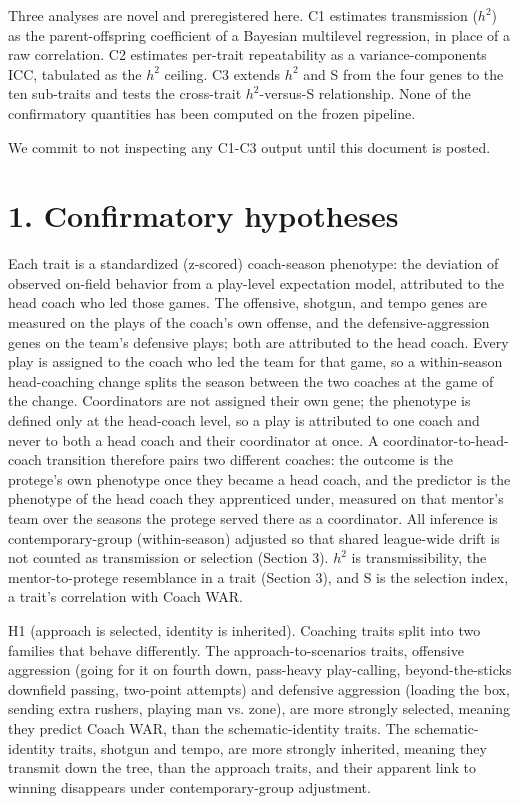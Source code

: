 \documentclass[11pt]{article}
\begin{document}
Three analyses are novel and preregistered here. C1 estimates transmission ($h^{2}$) as the parent-offspring coefficient of a Bayesian multilevel regression, in place of a raw correlation. C2 estimates per-trait repeatability as a variance-components ICC, tabulated as the $h^{2}$ ceiling. C3 extends $h^{2}$ and S from the four genes to the ten sub-traits and tests the cross-trait $h^{2}$-versus-S relationship. None of the confirmatory quantities has been computed on the frozen pipeline.

We commit to not inspecting any C1-C3 output until this document is posted.

\section*{1. Confirmatory hypotheses}

Each trait is a standardized (z-scored) coach-season phenotype: the deviation of observed on-field behavior from a play-level expectation model, attributed to the head coach who led those games. The offensive, shotgun, and tempo genes are measured on the plays of the coach's own offense, and the defensive-aggression genes on the team's defensive plays; both are attributed to the head coach. Every play is assigned to the coach who led the team for that game, so a within-season head-coaching change splits the season between the two coaches at the game of the change. Coordinators are not assigned their own gene; the phenotype is defined only at the head-coach level, so a play is attributed to one coach and never to both a head coach and their coordinator at once. A coordinator-to-head-coach transition therefore pairs two different coaches: the outcome is the protege's own phenotype once they became a head coach, and the predictor is the phenotype of the head coach they apprenticed under, measured on that mentor's team over the seasons the protege served there as a coordinator. All inference is contemporary-group (within-season) adjusted so that shared league-wide drift is not counted as transmission or selection (Section 3). $h^{2}$ is transmissibility, the mentor-to-protege resemblance in a trait (Section 3), and S is the selection index, a trait's correlation with Coach WAR.

H1 (approach is selected, identity is inherited). Coaching traits split into two families that behave differently. The approach-to-scenarios traits, offensive aggression (going for it on fourth down, pass-heavy play-calling, beyond-the-sticks downfield passing, two-point attempts) and defensive aggression (loading the box, sending extra rushers, playing man vs. zone), are more strongly selected, meaning they predict Coach WAR, than the schematic-identity traits. The schematic-identity traits, shotgun and tempo, are more strongly inherited, meaning they transmit down the tree, than the approach traits, and their apparent link to winning disappears under contemporary-group adjustment.
\end{document}
